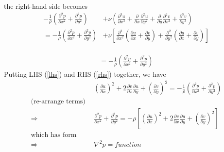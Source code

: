 \documentclass[11pt]{article}
\newcommand{\D}[2][]{\frac{\partial#1}{\partial#2}}
\begin{document}
the right-hand side becomes
\begin{align}
-\frac{1}{\rho} \left( \D[^2p]{x^2} + \D[^2p]{y^2} \right)
&+\nu \left( \D[^3u]{x^3} + \D{x} \D[^2u]{y^2} + \D{y} \D[^2v]{x^2} + \D[^3v]{y^3} \right)
	\nonumber \\ \nonumber
= -\frac{1}{\rho} \left( \D[^2p]{x^2} + \D[^2p]{y^2} \right)
&+ \nu \left[
  \D[^2]{x^2} \left( \D[u]{x} + \D[v]{y} \right)
+ \D[^2]{y^2} \left( \D[u]{x} + \D[v]{y} \right)
  \right]
  \label{rhs}
\end{align}
  \\
\begin{align}
= -\frac{1}{\rho} \left( \D[^2p]{x^2} + \D[^2p]{y^2} \right)
\end{align}
Putting LHS (\ref{lhs}) and RHS (\ref{rhs}) together, we have
\begin{align}
&\left(\D[u]{x}\right)^2 + 2\D[v]{x}\D[u]{y} + \left(\D[v]{y}\right)^2
=
-\frac{1}{\rho} \left( \D[^2p]{x^2} + \D[^2p]{y^2} \right)
\nonumber \\
\text{(re-arrange terms)}~~ \nonumber \\ \nonumber
\Rightarrow~~~&\D[^2p]{x^2} + \D[^2p]{y^2} =
- \rho \left[ \left(\D[u]{x}\right)^2 + 2\D[v]{x}\D[u]{y} + \left(\D[v]{y}\right)^2 \right]
\nonumber \\
\text{which has form}& \nonumber \\ \nonumber
\Rightarrow~~~&\nabla^2 p = function
\end{align}
\end{document}
